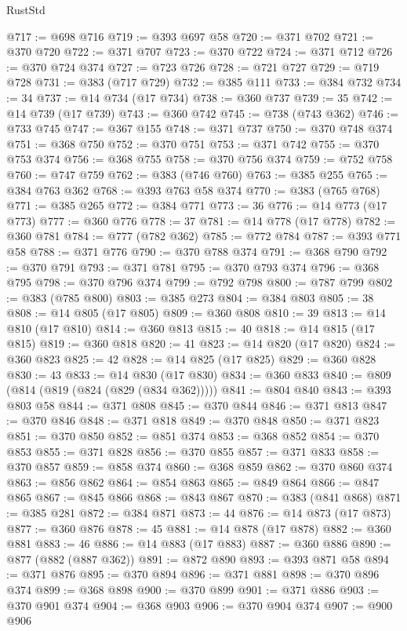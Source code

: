 \begin{lexlean}{RustStd}
\begin{coremodule}
{\begin{coremodule}
{{{{{{{{{{{{{{{{@717 := @698 @716
@719 := @393 @697 @58
@720 := @371 @702
@721 := @370 @720
@722 := @371 @707
@723 := @370 @722
@724 := @371 @712
@726 := @370 @724 @374
@727 := @723 @726
@728 := @721 @727
@729 := @719 @728
@731 := @383 (@717 @729)
@732 := @385 @111
@733 := @384 @732
@734 := 34
@737 := @14 @734 (@17 @734)
@738 := @360 @737
@739 := 35
@742 := @14 @739 (@17 @739)
@743 := @360 @742
@745 := @738 (@743 @362)
@746 := @733 @745
@747 := @367 @155
@748 := @371 @737
@750 := @370 @748 @374
@751 := @368 @750
@752 := @370 @751
@753 := @371 @742
@755 := @370 @753 @374
@756 := @368 @755
@758 := @370 @756 @374
@759 := @752 @758
@760 := @747 @759
@762 := @383 (@746 @760)
@763 := @385 @255
@765 := @384 @763 @362
@768 := @393 @763 @58 @374
@770 := @383 (@765 @768)
@771 := @385 @265
@772 := @384 @771
@773 := 36
@776 := @14 @773 (@17 @773)
@777 := @360 @776
@778 := 37
@781 := @14 @778 (@17 @778)
@782 := @360 @781
@784 := @777 (@782 @362)
@785 := @772 @784
@787 := @393 @771 @58
@788 := @371 @776
@790 := @370 @788 @374
@791 := @368 @790
@792 := @370 @791
@793 := @371 @781
@795 := @370 @793 @374
@796 := @368 @795
@798 := @370 @796 @374
@799 := @792 @798
@800 := @787 @799
@802 := @383 (@785 @800)
@803 := @385 @273
@804 := @384 @803
@805 := 38
@808 := @14 @805 (@17 @805)
@809 := @360 @808
@810 := 39
@813 := @14 @810 (@17 @810)
@814 := @360 @813
@815 := 40
@818 := @14 @815 (@17 @815)
@819 := @360 @818
@820 := 41
@823 := @14 @820 (@17 @820)
@824 := @360 @823
@825 := 42
@828 := @14 @825 (@17 @825)
@829 := @360 @828
@830 := 43
@833 := @14 @830 (@17 @830)
@834 := @360 @833
@840 := @809 (@814 (@819 (@824 (@829 (@834 @362)))))
@841 := @804 @840
@843 := @393 @803 @58
@844 := @371 @808
@845 := @370 @844
@846 := @371 @813
@847 := @370 @846
@848 := @371 @818
@849 := @370 @848
@850 := @371 @823
@851 := @370 @850
@852 := @851 @374
@853 := @368 @852
@854 := @370 @853
@855 := @371 @828
@856 := @370 @855
@857 := @371 @833
@858 := @370 @857
@859 := @858 @374
@860 := @368 @859
@862 := @370 @860 @374
@863 := @856 @862
@864 := @854 @863
@865 := @849 @864
@866 := @847 @865
@867 := @845 @866
@868 := @843 @867
@870 := @383 (@841 @868)
@871 := @385 @281
@872 := @384 @871
@873 := 44
@876 := @14 @873 (@17 @873)
@877 := @360 @876
@878 := 45
@881 := @14 @878 (@17 @878)
@882 := @360 @881
@883 := 46
@886 := @14 @883 (@17 @883)
@887 := @360 @886
@890 := @877 (@882 (@887 @362))
@891 := @872 @890
@893 := @393 @871 @58
@894 := @371 @876
@895 := @370 @894
@896 := @371 @881
@898 := @370 @896 @374
@899 := @368 @898
@900 := @370 @899
@901 := @371 @886
@903 := @370 @901 @374
@904 := @368 @903
@906 := @370 @904 @374
@907 := @900 @906
}}}}}}}}}}}}}}}}
\end{coremodule}}
\end{coremodule}
\end{lexlean}

